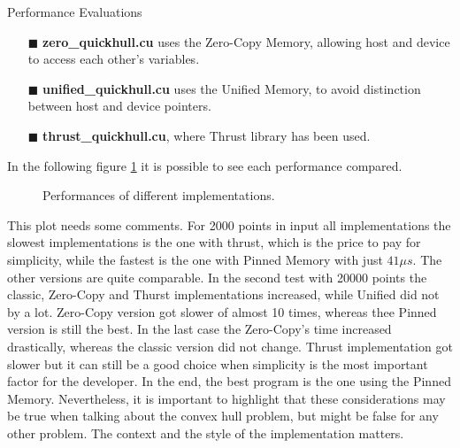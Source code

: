 \documentclass[a4paper,oneside,11pt,DIV12,headsepline,footexclude,headexclude]{scrartcl}
\begin{document}
\begin{section}{Performance Evaluations}
\begin{enumerate}
    \item[$\blacksquare$] \textbf{zero\_quickhull.cu} uses the Zero-Copy Memory, allowing host and device to access each other's variables.
\\
    \item[$\blacksquare$] \textbf{unified\_quickhull.cu} uses the Unified Memory, to avoid distinction between host and device pointers.
\\
    \item[$\blacksquare$]  \textbf{thrust\_quickhull.cu}, where Thrust library has been used.
\end{enumerate}
In the following figure \ref{gpus} it is possible to see each performance compared.
\begin{figure}[H]
    \centering
    
    \caption{Performances of different implementations.}
    \label{gpus}
\end{figure}
This plot needs some comments. For 2000 points in input all implementations the slowest implementations is the one with thrust, which is the price to pay for simplicity, while the fastest is the one with Pinned Memory with just \(41\mu s\). The other versions are quite comparable. In the second test with 20000 points the classic, Zero-Copy and Thurst implementations increased, while Unified did not by a lot. Zero-Copy version got slower of almost 10 times, whereas thee Pinned version is still the best. In the last case the Zero-Copy's time increased drastically, whereas the classic version did not change. Thrust implementation got slower but it can still be a good choice when simplicity is the most important factor for the developer. In the end, the best program is the one using the Pinned Memory. Nevertheless, it is important to highlight that these considerations may be true when talking about the convex hull problem, but might be false for any other problem. The context and the style of the implementation matters.

\end{section}
\end{document}
